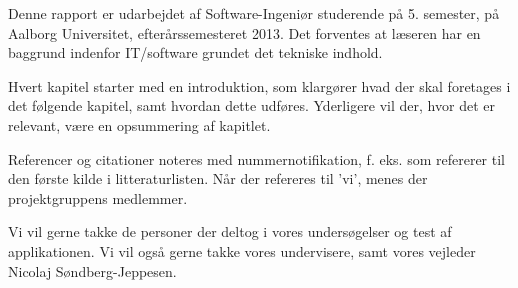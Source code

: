 Denne rapport er udarbejdet af Software-Ingeniør studerende på 5. semester, på Aalborg Universitet, efterårssemesteret 2013.
Det forventes at læseren har en baggrund indenfor IT/software grundet det tekniske indhold.

Hvert kapitel starter med en introduktion, som klargører hvad der skal foretages i det følgende kapitel, samt hvordan dette udføres.
Yderligere vil der, hvor det er relevant, være en opsummering af kapitlet.

Referencer og citationer noteres med nummernotifikation, f. eks. \cite{probabilisticRobotics} som refererer til den første kilde i litteraturlisten.
Når der refereres til 'vi', menes der projektgruppens medlemmer.

Vi vil gerne takke de personer der deltog i vores undersøgelser og test af applikationen.
Vi vil også gerne takke vores undervisere, samt vores vejleder Nicolaj Søndberg-Jeppesen.
